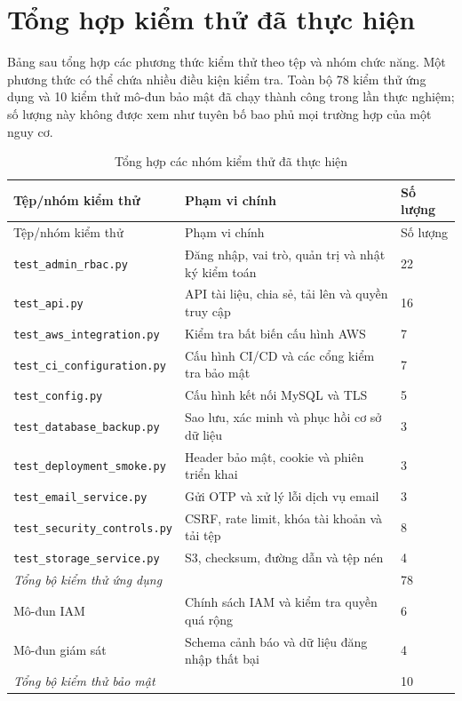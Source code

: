 \chapter{Tổng hợp kiểm thử đã thực hiện}
Bảng sau tổng hợp các phương thức kiểm thử theo tệp và nhóm chức năng. Một phương thức có thể chứa nhiều điều kiện kiểm tra. Toàn bộ 78 kiểm thử ứng dụng và 10 kiểm thử mô-đun bảo mật đã chạy thành công trong lần thực nghiệm; số lượng này không được xem như tuyên bố bao phủ mọi trường hợp của một nguy cơ.

{\small\begin{longtable}{P{5.2cm}P{5.7cm}P{1.6cm}}
\caption{Tổng hợp các nhóm kiểm thử đã thực hiện}\\\toprule
\textbf{Tệp/nhóm kiểm thử}&\textbf{Phạm vi chính}&\textbf{Số lượng}\\\midrule\endfirsthead
\toprule Tệp/nhóm kiểm thử&Phạm vi chính&Số lượng\\\midrule\endhead
\nolinkurl{test_admin_rbac.py} & Đăng nhập, vai trò, quản trị và nhật ký kiểm toán & 22\\
\nolinkurl{test_api.py} & API tài liệu, chia sẻ, tải lên và quyền truy cập & 16\\
\nolinkurl{test_aws_integration.py} & Kiểm tra bất biến cấu hình AWS & 7\\
\nolinkurl{test_ci_configuration.py} & Cấu hình CI/CD và các cổng kiểm tra bảo mật & 7\\
\nolinkurl{test_config.py} & Cấu hình kết nối MySQL và TLS & 5\\
\nolinkurl{test_database_backup.py} & Sao lưu, xác minh và phục hồi cơ sở dữ liệu & 3\\
\nolinkurl{test_deployment_smoke.py} & Header bảo mật, cookie và phiên triển khai & 3\\
\nolinkurl{test_email_service.py} & Gửi OTP và xử lý lỗi dịch vụ email & 3\\
\nolinkurl{test_security_controls.py} & CSRF, rate limit, khóa tài khoản và tải tệp & 8\\
\nolinkurl{test_storage_service.py} & S3, checksum, đường dẫn và tệp nén & 4\\
\textit{Tổng bộ kiểm thử ứng dụng} & & 78\\\midrule
Mô-đun IAM & Chính sách IAM và kiểm tra quyền quá rộng & 6\\
Mô-đun giám sát & Schema cảnh báo và dữ liệu đăng nhập thất bại & 4\\
\textit{Tổng bộ kiểm thử bảo mật} & & 10\\\bottomrule
\end{longtable}}

